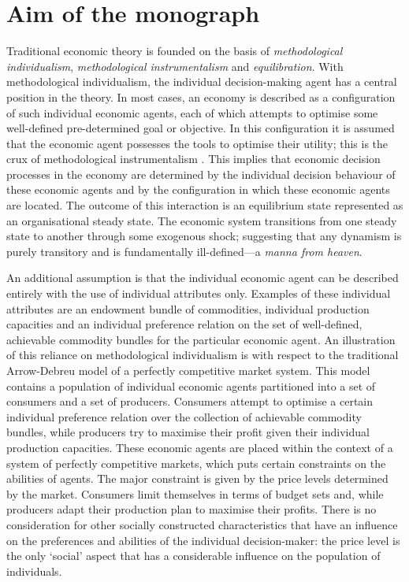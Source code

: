 \section{Aim of the monograph}
\label{sec:aaimOfMonograph}

Traditional economic theory is founded on the basis of \emph{methodological individualism}, \emph{methodological instrumentalism} and \emph{equilibration}. With methodological individualism, the individual decision-making agent has a central position in the theory. In most cases, an economy is described as a configuration of such individual economic agents, each of which attempts to optimise some well-defined pre-determined goal or objective. In this configuration it is assumed that the economic agent possesses the tools to optimise their utility; this is the crux of methodological instrumentalism \citep{Arnsperger2006}. This implies that economic decision processes in the economy are determined by the individual decision behaviour of these economic agents and by the configuration in which these economic agents are located. The outcome of this interaction is an equilibrium state represented as an organisational steady state. The economic system transitions from one steady state to another through some exogenous shock; suggesting that any dynamism is purely transitory and is fundamentally ill-defined---a \emph{manna from heaven}.

An additional assumption is that the individual economic agent can be described entirely with the use of individual attributes only. Examples of these individual attributes are an endowment bundle of commodities, individual production capacities and an individual preference relation on the set of well-defined, achievable commodity bundles for the particular economic agent. An illustration of this reliance on methodological individualism is with respect to the traditional Arrow-Debreu model of a perfectly competitive market system. This model contains a population of individual economic agents partitioned into a set of consumers and a set of producers. Consumers attempt to optimise a certain individual preference relation over the collection of achievable commodity bundles, while producers try to maximise their profit given their individual production capacities. These economic agents are placed within the context of a system of perfectly competitive markets, which puts certain constraints on the abilities of agents. The major constraint is given by the price levels determined by the market. Consumers limit themselves in terms of budget sets and, while producers adapt their production plan to maximise their profits. There is no consideration for other socially constructed characteristics that have an influence on the preferences and abilities of the individual decision-maker: the price level is the only `social' aspect that has a considerable influence on the population of individuals.

